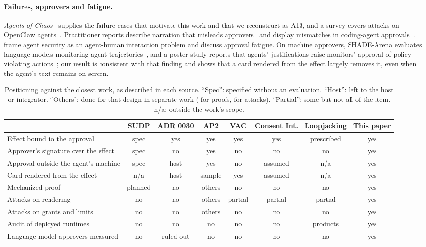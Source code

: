 \paragraph{Failures, approvers and fatigue.} \emph{Agents of Chaos}~\citep{shapira2026agents} supplies the failure cases
that motivate this work and that we reconstruct as A13, and a survey covers attacks on OpenClaw
agents~\citep{wang2026openclaw}. Practitioner reports describe narration that misleads
approvers~\citep{checkmarx2025lies} and display mismatches in coding-agent approvals~\citep{wiz2026ghostapproval}.
\citet{wang2026reframing} frame agent security as an agent-human interaction problem and discuss approval fatigue.
On machine approvers, SHADE-Arena evaluates language models monitoring agent
trajectories~\citep{kutasov2025shade}, and a poster study reports that agents' justifications raise monitors'
approval of policy-violating actions~\citep{za2025persuasion}; our  result is consistent with that finding and
shows that a card rendered from the effect largely removes it, even when the agent's text remains on screen.

\begin{table}[t]
\centering\small
\caption{Positioning against the closest work, as described in each source. ``Spec'': specified without an
evaluation. ``Host'': left to the host or integrator. ``Others'': done for that design in separate work
(\citealp{jiang2026payment} for proofs, \citealp{aviv2026ap2} for attacks). ``Partial'': some but not all of the
item. n/a: outside the work's scope.}
\label{tab:related}
\setlength{\tabcolsep}{3pt}
\begin{tabular}{@{}l c c c c c c c@{}}
\toprule
 & SUDP & ADR 0030 & AP2 & VAC & Consent Int. & Loopjacking & This paper\\
\midrule
Effect bound to the approval & spec & yes & yes & yes & yes & prescribed & yes\\
Approver's signature over the effect & spec & no & yes & no & no & no & yes\\
Approval outside the agent's machine & spec & host & yes & no & assumed & n/a & yes\\
Card rendered from the effect & n/a & host & sample & yes & assumed & n/a & yes\\
Mechanized proof & planned & no & others & no & no & no & yes\\
Attacks on rendering & no & no & others & partial & partial & partial & yes\\
Attacks on grants and limits & no & no & others & no & no & no & yes\\
Audit of deployed runtimes & no & no & no & no & no & products & yes\\
Language-model approvers measured & no & ruled out & no & no & no & no & yes\\
\bottomrule
\end{tabular}
\end{table}
